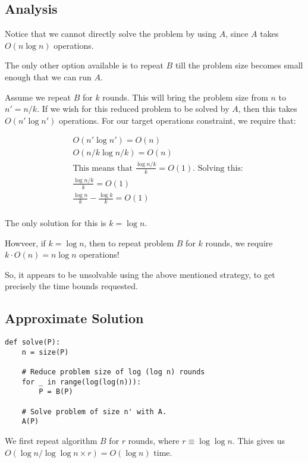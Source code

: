 \documentclass{article}
\begin{document}
\subsection{Analysis}
Notice that we cannot directly solve the problem by using $A$, since $A$
takes $O(n \log n)$ operations.

The only other option available is to repeat $B$ till the problem size becomes
small enough that we can run $A$.

Assume we repeat $B$ for $k$ rounds. This will bring the problem size from $n$
to $n' = n/k$. If we wish for this reduced problem to be solved by $A$, then
this takes $O(n' \log n')$ operations. For our target operations constraint,
we require that:

\begin{align*}
    &O(n' \log n') = O(n) \\
    &O(n/k \log n/k) = O(n) \\
    &\text{This means that $\frac{\log n/k}{k} = O(1)$. Solving this:} \\
    &\frac{\log n/k}{k} = O(1) \\
    &\frac{\log n}{k} - \frac{\log k}{k} = O(1) \\
\end{align*}

The only solution for this is $k = \log n$. 

Howveer, if $k = \log n$, then to repeat problem $B$ for $k$ rounds, we require
$k \cdot O(n) = n \log n$ operations!

So, it appears to be unsolvable using the above mentioned strategy, to
get precisely the time bounds requested.

\subsection{Approximate Solution}





\begin{verbatim}
def solve(P):
    n = size(P)

    # Reduce problem size of log (log n) rounds
    for _ in range(log(log(n))):
        P = B(P)

    # Solve problem of size n' with A.
    A(P)
\end{verbatim}

We first repeat algorithm $B$ for $r$ rounds, where $r \equiv \log \log n$.
This gives us $O(\log n / \log \log n \times r) = O(\log n)$ time.
\end{document}
